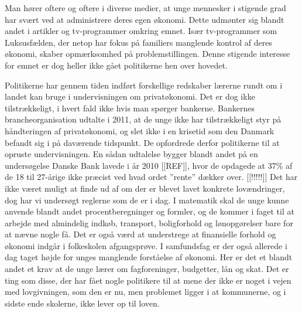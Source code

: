 Man hører oftere og oftere i diverse medier, at unge mennesker i stigende grad har svært ved at administrere deres egen økonomi. Dette udmønter sig blandt andet i artikler og tv-programmer omkring emnet. Især tv-programmer som Luksusfælden, der netop har fokus på familiers manglende kontrol af deres økonomi, skaber opmærksomhed på problemstillingen. Denne stigende interesse for emnet er dog heller ikke gået politikerne hen over hovedet.

Politikerne har gennem tiden indført forskellige redskaber lærerne rundt om i landet kan bruge i undervisningen om privatøkonomi. Det er dog ikke tilstrækkeligt, i hvert fald ikke hvis man spørger bankerne. Bankernes brancheorganisation udtalte i 2011, at de unge ikke har tilstrækkeligt styr på håndteringen af privatøkonomi, og slet ikke i en krisetid som den Danmark befandt sig i på daværende tidspunkt. De opfordrede derfor politikerne til at opruste undervisningen. En sådan udtalelse bygger blandt andet på en undersøgelse Danske Bank lavede i år 2010 [[REF]], hvor de opdagede at 37\% af de 18 til 27-årige ikke præcist ved hvad ordet ”rente” dækker over. [[!!!!!]] Det har ikke været muligt at finde ud af om der er blevet lavet konkrete lovændringer, dog har vi undersøgt reglerne som de er i dag. I matematik skal de unge kunne anvende blandt andet procentberegninger og formler, og de kommer i faget til at arbejde med almindelig indkøb, transport, boligforhold og lønopgørelser bare for at nævne nogle få. Det er også værd at understrege at finansielle forhold og økonomi indgår i folkeskolen afgangsprøve. I samfundsfag er der også allerede i dag taget højde for unges manglende forståelse af økonomi. Her er det et blandt andet et krav at de unge lærer om fagforeninger, budgetter, lån og skat. Det er ting som disse, der har fået nogle politikere til at mene der ikke er noget i vejen med lovgivningen, som den er nu, men problemet ligger i at kommunerne, og i sidste ende skolerne, ikke lever op til loven.

